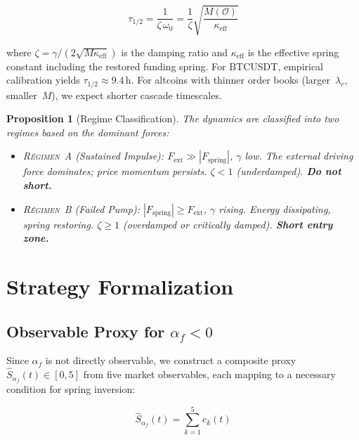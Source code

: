 \documentclass[11pt,a4paper]{article}
\newtheorem{proposition}{Proposition}[section]
\newcommand{\af}{\alpha_f}
\newcommand{\Fext}{F_{\mathrm{ext}}}
\newcommand{\Fspring}{F_{\mathrm{spring}}}
\newcommand{\regime}[1]{\textsc{R\'{e}gimen~#1}}
\newcommand{\OI}{\mathcal{O}}
\begin{document}
\begin{equation}
\label{eq:tau}
\tau_{1/2} = \frac{1}{\zeta\,\omega_0} 
= \frac{1}{\zeta}\sqrt{\frac{M(\OI)}{\kappa_{\mathrm{eff}}}}
\end{equation}

\noindent where $\zeta = \gamma / (2\sqrt{M\kappa_{\mathrm{eff}}})$ is the 
damping ratio and $\kappa_{\mathrm{eff}}$ is the effective spring constant 
including the restored funding spring. For BTCUSDT, empirical calibration 
yields $\tau_{1/2} \approx 9.4$\,h. For altcoins with thinner order books 
(larger~$\lambda_r$, smaller~$M$), we expect shorter cascade timescales.

\begin{proposition}[Regime Classification]
\label{prop:regimes}
The dynamics are classified into two regimes based on the dominant forces:
\begin{itemize}[nosep]
    \item \regime{A} (Sustained Impulse): $\Fext \gg |\Fspring|$, $\gamma$ low. 
    The external driving force dominates; price momentum persists. 
    $\zeta < 1$ (underdamped). \textbf{Do not short.}
    \item \regime{B} (Failed Pump): $|\Fspring| \ge \Fext$, $\gamma$ rising. 
    Energy dissipating, spring restoring. $\zeta \ge 1$ (overdamped or critically 
    damped). \textbf{Short entry zone.}
\end{itemize}
\end{proposition}

\section{Strategy Formalization}
\label{sec:strategy}

\subsection{Observable Proxy for $\af < 0$}

Since $\af$ is not directly observable, we construct a composite proxy 
$\hat{S}_{\af}(t) \in [0,5]$ from five market observables, each mapping to a 
necessary condition for spring inversion:

\begin{equation}
\label{eq:score}
\hat{S}_{\af}(t) = \sum_{k=1}^{5} c_k(t)
\end{equation}
\end{document}
